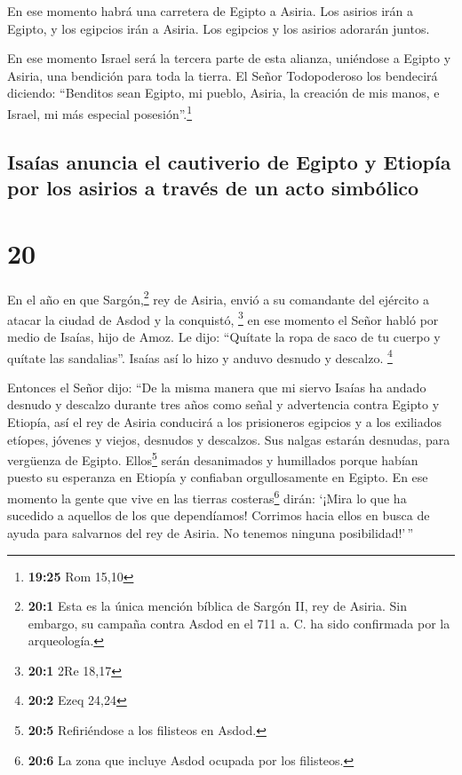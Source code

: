  En ese momento habrá una carretera de Egipto a Asiria.
Los asirios irán a Egipto, y los egipcios irán a Asiria. Los egipcios y
los asirios adorarán juntos.

 En ese momento Israel será la tercera parte de esta
alianza, uniéndose a Egipto y Asiria, una bendición para toda la tierra.
 El Señor Todopoderoso los bendecirá diciendo: ``Benditos
sean Egipto, mi pueblo, Asiria, la creación de mis manos, e Israel, mi
más especial posesión''.\footnote{\textbf{19:25} Rom 15,10}

\hypertarget{isauxedas-anuncia-el-cautiverio-de-egipto-y-etiopuxeda-por-los-asirios-a-travuxe9s-de-un-acto-simbuxf3lico}{%
\subsection{Isaías anuncia el cautiverio de Egipto y Etiopía por los
asirios a través de un acto
simbólico}\label{isauxedas-anuncia-el-cautiverio-de-egipto-y-etiopuxeda-por-los-asirios-a-travuxe9s-de-un-acto-simbuxf3lico}}

\hypertarget{section-19}{%
\section{20}\label{section-19}}

 En el año en que Sargón,\footnote{\textbf{20:1} Esta es
  la única mención bíblica de Sargón II, rey de Asiria. Sin embargo, su
  campaña contra Asdod en el 711 a. C. ha sido confirmada por la
  arqueología.} rey de Asiria, envió a su comandante del ejército a
atacar la ciudad de Asdod y la conquistó, \footnote{\textbf{20:1} 2Re
  18,17}  en ese momento el Señor habló por medio de
Isaías, hijo de Amoz. Le dijo: ``Quítate la ropa de saco de tu cuerpo y
quítate las sandalias''. Isaías así lo hizo y anduvo desnudo y descalzo.
\footnote{\textbf{20:2} Ezeq 24,24}

 Entonces el Señor dijo: ``De la misma manera que mi
siervo Isaías ha andado desnudo y descalzo durante tres años como señal
y advertencia contra Egipto y Etiopía,  así el rey de
Asiria conducirá a los prisioneros egipcios y a los exiliados etíopes,
jóvenes y viejos, desnudos y descalzos. Sus nalgas estarán desnudas,
para vergüenza de Egipto.  Ellos\footnote{\textbf{20:5}
  Refiriéndose a los filisteos en Asdod.} serán desanimados y humillados
porque habían puesto su esperanza en Etiopía y confiaban orgullosamente
en Egipto.  En ese momento la gente que vive en las
tierras costeras\footnote{\textbf{20:6} La zona que incluye Asdod
  ocupada por los filisteos.} dirán: `¡Mira lo que ha sucedido a
aquellos de los que dependíamos! Corrimos hacia ellos en busca de ayuda
para salvarnos del rey de Asiria. No tenemos ninguna posibilidad!'\,''

